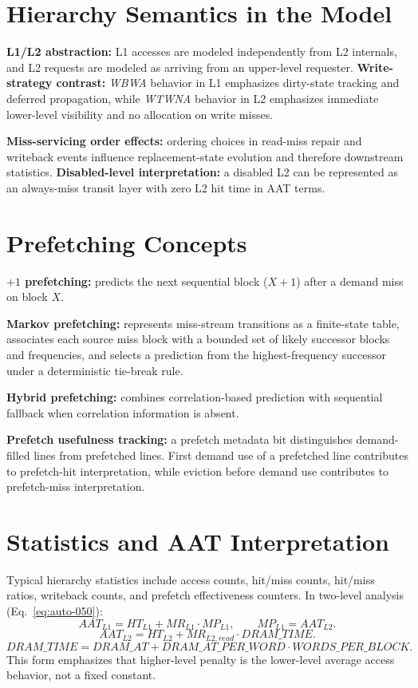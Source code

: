 \section{Hierarchy Semantics in the Model}\label{sec:auto-051}
\textbf{L1/L2 abstraction:} L1 accesses are modeled independently from L2 internals, and L2 requests are modeled as arriving from an upper-level requester.
\textbf{Write-strategy contrast:} \textit{WBWA} behavior in L1 emphasizes dirty-state tracking and deferred propagation, while \textit{WTWNA} behavior in L2 emphasizes immediate lower-level visibility and no allocation on write misses.

\textbf{Miss-servicing order effects:} ordering choices in read-miss repair and writeback events influence replacement-state evolution and therefore downstream statistics.
\textbf{Disabled-level interpretation:} a disabled L2 can be represented as an always-miss transit layer with zero L2 hit time in AAT terms.

\section{Prefetching Concepts}\label{sec:auto-052}
\textbf{$+1$ prefetching:} predicts the next sequential block ($X+1$) after a demand miss on block $X$.

\textbf{Markov prefetching:}
represents miss-stream transitions as a finite-state table, associates each source miss block with a bounded set of likely successor blocks and frequencies, and selects a prediction from the highest-frequency successor under a deterministic tie-break rule.

\textbf{Hybrid prefetching:} combines correlation-based prediction with sequential fallback when correlation information is absent.

\textbf{Prefetch usefulness tracking:}
a prefetch metadata bit distinguishes demand-filled lines from prefetched lines.
First demand use of a prefetched line contributes to prefetch-hit interpretation, while eviction before demand use contributes to prefetch-miss interpretation.

\section{Statistics and AAT Interpretation}\label{sec:auto-053}
Typical hierarchy statistics include access counts, hit/miss counts, hit/miss ratios, writeback counts, and prefetch effectiveness counters.
In two-level analysis (Eq.~\eqref{eq:auto-050}):
\begin{equation}\label{eq:auto-050}
AAT_{L1}=HT_{L1}+MR_{L1}\cdot MP_{L1},\qquad MP_{L1}=AAT_{L2}.
\end{equation}
\begin{equation}\label{eq:auto-051}
AAT_{L2}=HT_{L2}+MR_{L2,read}\cdot DRAM\_TIME.
\end{equation}
\begin{equation}\label{eq:auto-052}
DRAM\_TIME = DRAM\_AT + DRAM\_AT\_PER\_WORD\cdot WORDS\_PER\_BLOCK.
\end{equation}
This form emphasizes that higher-level penalty is the lower-level average access behavior, not a fixed constant.

